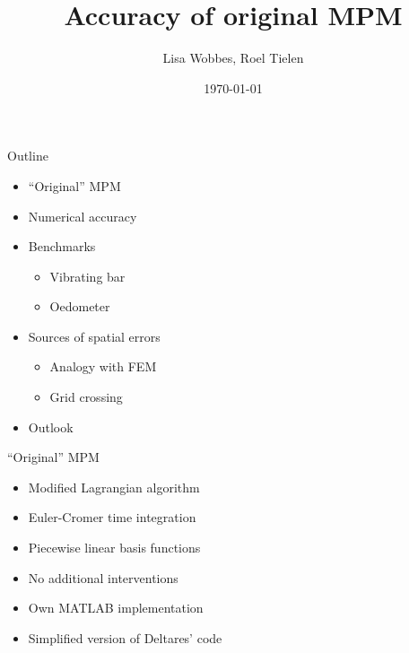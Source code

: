 \documentclass[mathserif,professionalfont,hyperref={pdfpagelabels=false}]{beamer}
\title[Accuracy of original MPM]{Accuracy of original MPM}
\author[]{Lisa Wobbes, Roel Tielen}
\date[\today]{\today}
\begin{document}
{
\frame{\titlepage}
}

\begin{frame}{Outline}
\begin{itemize}
\item ``Original'' MPM
\item Numerical accuracy
\item Benchmarks
	\begin{itemize}
	\item Vibrating bar 
	\item Oedometer
	\end{itemize}
\item Sources of spatial errors
\begin{itemize}
\item Analogy with FEM
\item Grid crossing
\end{itemize}
\item Outlook
\end{itemize}
\end{frame}

\begin{frame}{``Original'' MPM}
\begin{itemize}
\item Modified Lagrangian algorithm
\item Euler-Cromer time integration
\item Piecewise linear basis functions
\item No additional interventions
\pause
\item Own MATLAB implementation
\item Simplified version of Deltares' code
\end{itemize}
\end{frame}
\end{document}
